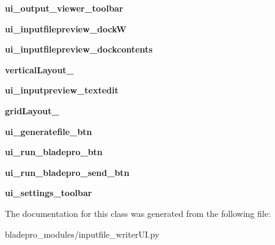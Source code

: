 \begin{DoxyCompactItemize}
{\bfseries ui\+\_\+output\+\_\+viewer\+\_\+toolbar}
\item 
\hypertarget{a00077_a0320b1d504d7c939f637497d3ddb29cd}{}\label{a00077_a0320b1d504d7c939f637497d3ddb29cd} 
{\bfseries ui\+\_\+inputfilepreview\+\_\+dockW}
\item 
\hypertarget{a00077_a0a9b9095e43dff8b0591f5c99ed096b8}{}\label{a00077_a0a9b9095e43dff8b0591f5c99ed096b8} 
{\bfseries ui\+\_\+inputfilepreview\+\_\+dockcontents}
\item 
\hypertarget{a00077_af6dda5301b2c18cc6cb517d406371cd8}{}\label{a00077_af6dda5301b2c18cc6cb517d406371cd8} 
{\bfseries vertical\+Layout\+\_}
\item 
\hypertarget{a00077_a0a84b37e3d14b098f01ea8245886422b}{}\label{a00077_a0a84b37e3d14b098f01ea8245886422b} 
{\bfseries ui\+\_\+inputpreview\+\_\+textedit}
\item 
\hypertarget{a00077_a1165976bce8597d5c2b05749090db4bb}{}\label{a00077_a1165976bce8597d5c2b05749090db4bb} 
{\bfseries grid\+Layout\+\_}
\item 
\hypertarget{a00077_aebd557fcfd5421d6699c90c70a00964a}{}\label{a00077_aebd557fcfd5421d6699c90c70a00964a} 
{\bfseries ui\+\_\+generatefile\+\_\+btn}
\item 
\hypertarget{a00077_a0cf12a13035007f59d8f7d6412303347}{}\label{a00077_a0cf12a13035007f59d8f7d6412303347} 
{\bfseries ui\+\_\+run\+\_\+bladepro\+\_\+btn}
\item 
\hypertarget{a00077_a0138512db7f881556de8ed89ee615c76}{}\label{a00077_a0138512db7f881556de8ed89ee615c76} 
{\bfseries ui\+\_\+run\+\_\+bladepro\+\_\+send\+\_\+btn}
\item 
\hypertarget{a00077_a4610a54fb1790404af1664e4aa5d5883}{}\label{a00077_a4610a54fb1790404af1664e4aa5d5883} 
{\bfseries ui\+\_\+settings\+\_\+toolbar}
\end{DoxyCompactItemize}


The documentation for this class was generated from the following file\+:\begin{DoxyCompactItemize}
\item 
bladepro\+\_\+modules/inputfile\+\_\+writer\+U\+I.\+py\end{DoxyCompactItemize}

